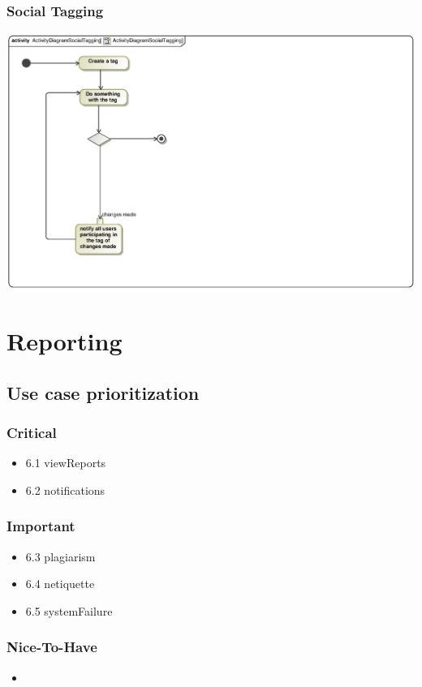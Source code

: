 \documentclass[hidelinks, 12pt, oneside]{article}
\begin{document}
\subsubsection{Social Tagging}
\includegraphics[scale=.9]{Semaka/graphics/activityDiagramSocialTagging.eps}\\

\section{Reporting}
\subsection{Use case prioritization}
\subsubsection{Critical}
\begin{itemize}
  \item 6.1 viewReports
  \item 6.2 notifications
\end{itemize}

\subsubsection{Important}
\begin{itemize}
  \item 6.3 plagiarism
  \item 6.4 netiquette
  \item 6.5 systemFailure
\end{itemize}
\subsubsection{Nice-To-Have}
\begin{itemize}
  \item 
\end{itemize}
\end{document}
